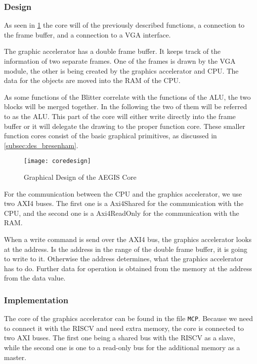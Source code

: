 \subsubsection*{Design}
As seen in \cref{img:coredes} the core will of the previously described functions, a connection to the frame buffer, and a connection to a VGA interface.

The graphic accelerator has a double frame buffer. It keeps track of the information of two separate frames. One of the frames is drawn by the VGA module, the other is being created by the graphics accelerator and CPU. The data for the objects are moved into the RAM of the CPU.

As some functions of the Blitter correlate with the functions of the ALU\cite{data1988amiga}, the two blocks will be merged together. In the following the two of them will be referred to as the ALU. This part of the core will either write directly into the frame buffer or it will delegate the drawing to the proper function core. These smaller function cores consist of the basic graphical primitives, as discussed in \cref{subsec:des_bresenham}.
\begin{figure}[H]
	\centering
	\texttt{[image: coredesign]}
	\caption{Graphical Design of the AEGIS Core }
	\label{img:coredes}
\end{figure}

For the communication between the CPU and the graphics accelerator, we use two AXI4 buses. The first one is a Axi4Shared for the communication with the CPU, and the second one is a Axi4ReadOnly for the communication with the RAM.

When a write command is send over the AXI4 bus, the graphics accelerator looks at the address. Is the address in the range of the double frame buffer, it is going to write to it. Otherwise the address determines, what the graphics accelerator has to do. Further data for operation is obtained from the memory at the address from the data value.

\subsubsection*{Implementation}
The core of the graphics accelerator can be found in the file \texttt{MCP}. Because we need to connect it with the RISCV and need extra memory, the core is connected to two AXI buses. The first one being a shared bus with the RISCV as a slave, while the second one is one to a read-only bus for the additional memory as a master.

